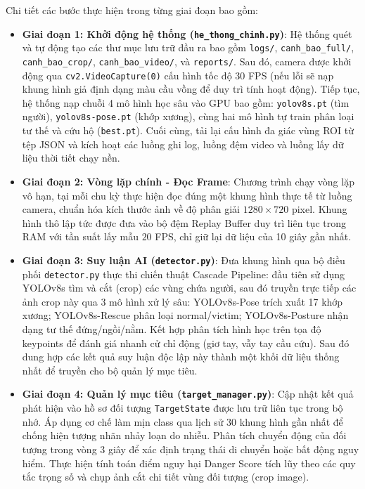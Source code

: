 \newpage
Chi tiết các bước thực hiện trong từng giai đoạn bao gồm:
\begin{itemize}
    \item \textbf{Giai đoạn 1: Khởi động hệ thống (\texttt{he\_thong\_chinh.py})}: 
    Hệ thống quét và tự động tạo các thư mục lưu trữ đầu ra bao gồm \texttt{logs/}, \texttt{canh\_bao\_full/}, \texttt{canh\_bao\_crop/}, \texttt{canh\_bao\_video/}, và \texttt{reports/}. Sau đó, camera được khởi động qua \texttt{cv2.VideoCapture(0)} cấu hình tốc độ $30$ FPS (nếu lỗi sẽ nạp khung hình giả định dạng màu cầu vồng để duy trì tính hoạt động). Tiếp tục, hệ thống nạp chuỗi 4 mô hình học sâu vào GPU bao gồm: \texttt{yolov8s.pt} (tìm người), \texttt{yolov8s-pose.pt} (khớp xương), cùng hai mô hình tự train phân loại tư thế và cứu hộ (\texttt{best.pt}). Cuối cùng, tải lại cấu hình đa giác vùng ROI từ tệp JSON và kích hoạt các luồng ghi log, luồng đệm video và luồng lấy dữ liệu thời tiết chạy nền.
    
    \item \textbf{Giai đoạn 2: Vòng lặp chính - Đọc Frame}:
    Chương trình chạy vòng lặp vô hạn, tại mỗi chu kỳ thực hiện đọc đúng một khung hình thực tế từ luồng camera, chuẩn hóa kích thước ảnh về độ phân giải $1280 \times 720$ pixel. Khung hình thô lập tức được đưa vào bộ đệm Replay Buffer duy trì liên tục trong RAM với tần suất lấy mẫu $20$ FPS, chỉ giữ lại dữ liệu của 10 giây gần nhất.
    
    \item \textbf{Giai đoạn 3: Suy luận AI (\texttt{detector.py})}:
    Đưa khung hình qua bộ điều phối \texttt{detector.py} thực thi chiến thuật Cascade Pipeline: đầu tiên sử dụng YOLOv8s tìm và cắt (crop) các vùng chứa người, sau đó truyền trực tiếp các ảnh crop này qua 3 mô hình xử lý sâu: YOLOv8s-Pose trích xuất 17 khớp xương; YOLOv8s-Rescue phân loại normal/victim; YOLOv8s-Posture nhận dạng tư thế đứng/ngồi/nằm. Kết hợp phân tích hình học trên tọa độ keypoints để đánh giá nhanh cử chỉ động (giơ tay, vẫy tay cầu cứu). Sau đó dung hợp các kết quả suy luận độc lập này thành một khối dữ liệu thống nhất để truyền cho bộ quản lý mục tiêu.
    
    \item \textbf{Giai đoạn 4: Quản lý mục tiêu (\texttt{target\_manager.py})}:
    Cập nhật kết quả phát hiện vào hồ sơ đối tượng \texttt{TargetState} được lưu trữ liên tục trong bộ nhớ. Áp dụng cơ chế làm mịn class qua lịch sử 30 khung hình gần nhất để chống hiện tượng nhãn nhảy loạn do nhiễu. Phân tích chuyển động của đối tượng trong vòng 3 giây để xác định trạng thái di chuyển hoặc bất động nguy hiểm. Thực hiện tính toán điểm nguy hại Danger Score tích lũy theo các quy tắc trọng số và chụp ảnh cắt chi tiết vùng đối tượng (crop image).
    

\end{itemize}
